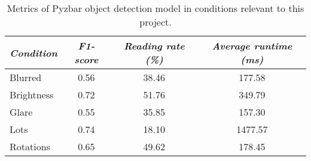\documentclass[../main.tex]{subfiles}
\begin{document}
\begin{table}[H]
    \centering
    \caption{Metrics of Pyzbar object detection model in conditions
    relevant to this project.}
    \begin{tabularx}{0.73\textwidth}{ X c c c }
        \toprule
        \textit{Condition} 
            & \textit{F1-score} 
                & \textit{Reading rate (\%)} 
                    & \textit{Average runtime (ms)} \\

        \midrule
        
        Blurred 
            & 0.56
            & 38.46
                & 177.58
                \\
        
        Brightness
            & 0.72
            & 51.76
                & 349.79
                \\
        
        Glare
            & 0.55
            & 35.85
                & 157.30
                \\
        
        Lots
            & 0.74
            & 18.10
                & 1477.57
                \\
        
        Rotations
            & 0.65
            & 49.62
                & 178.45
                \\
        
        \bottomrule		
    \end{tabularx}
\end{table}
\end{document}
